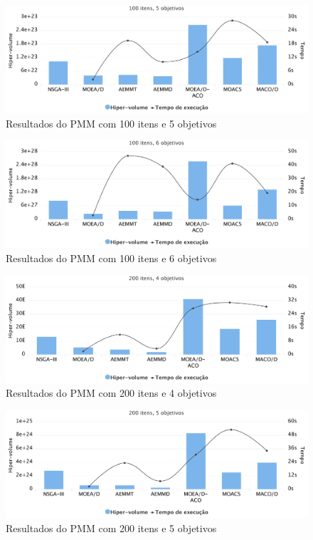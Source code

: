 \begin{figure}[!htbp]
	\caption{Resultados do PMM com 100 itens e 5 objetivos}
	\label{fig_exp4_i100o5}
	\includegraphics[width=1\textwidth]{cap_experimentos/figs/etapa4/i100o5}
\end{figure}

\begin{figure}[!htbp]
	\caption{Resultados do PMM com 100 itens e 6 objetivos}
	\label{fig_exp4_i100o6}
	\includegraphics[width=1\textwidth]{cap_experimentos/figs/etapa4/i100o6}
\end{figure}

\begin{figure}[!htbp]
	\caption{Resultados do PMM com 200 itens e 4 objetivos}
	\label{fig_exp4_i200o4}
	\includegraphics[width=1\textwidth]{cap_experimentos/figs/etapa4/i200o4}
\end{figure}

\begin{figure}[!htbp]
	\caption{Resultados do PMM com 200 itens e 5 objetivos}
	\label{fig_exp4_i200o5}
	\includegraphics[width=1\textwidth]{cap_experimentos/figs/etapa4/i200o5}
\end{figure}

